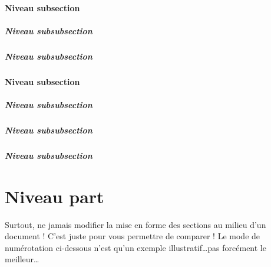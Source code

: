 \documentclass[12pt]{report}
\def\thechapter{\Roman{chapter}} %
\def\thesection{\Alph{section}}
\def\thesubsection{\Roman{subsection}} %
\def\thesubsubsection{\arabic{subsubsection}} %
\def\theparagraph{\roman{paragraph}} %
\def\thesubparagraph{\alph{subparagraph}} %
\def\thechapter{\arabic{chapter}} %
\def\thesection{\arabic{chapter}.\arabic{section}}
\def\thesubsection{\arabic{chapter}.\arabic{section}.\arabic{subsection}} %
\def\thesubsubsection{\arabic{chapter}.\arabic{section}.\arabic{subsection}.\arabic{subsubsection}} %
\def\theparagraph{\arabic{chapter}.\arabic{section}.\arabic{subsection}.\arabic{subsubsection}.\arabic{paragraph}} %
\def\thesubparagraph{} %
\begin{document}
\subsection{Niveau subsection}

\subsubsection{Niveau subsubsection}

\subsubsection{Niveau subsubsection}

\subsection{Niveau subsection}

\subsubsection{Niveau subsubsection}

\subsubsection{Niveau subsubsection}

\subsubsection{Niveau subsubsection}


\part{Niveau part}

Surtout, ne jamais modifier la mise en forme des sections au milieu
d'un document ! C'est juste pour vous permettre de comparer ! Le mode
de numérotation ci-dessous n'est qu'un exemple illustratif\ldots pas
forcément le meilleur\ldots

\def\thechapter{\Roman{chapter}} %
\def\thesection{\Alph{section}}
\def\thesubsection{\roman{subsection}} %
\def\thesubsubsection{\arabic{subsubsection}} %
\def\theparagraph{\alph{paragraph}} %
\def\thesubparagraph{\alph{subparagraph}} %
\end{document}
